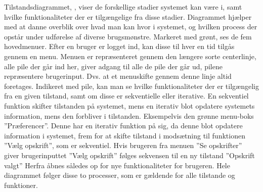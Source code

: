 Tilstandsdiagrammet, , viser de forskellige stadier systemet kan være i, samt hvilke funktionaliteter der er tilgængelige fra disse stadier.
Diagrammet hjælper med at danne overblik over hvad man kan hvor i systemet, og hvilken process der opstår under udførelse af diverse brugsmønstre.
Markeret med grønt, ses de fem hovedmenuer. 
Efter en bruger er logget ind, kan disse til hver en tid tilgås gennem en menu.
Menuen er repræsenteret gennem den længere sorte centerlinje,  alle pile der går ind her, giver adgang til alle de pile der går ud, pilene repræsentere brugerinput.
Dvs. at et menuskifte gennem denne linje altid foretages.
Indikeret med pile, kan man se hvilke funktionaliteter der er tilgængelig fra en given tilstand, samt om disse er sekventielle eller iterative.
En sekventiel funktion skifter tilstanden på systemet, mens en iterativ blot opdatere systemets information, mens den forbliver i tilstanden.
Eksempelvis den grønne menu-boks ''Præferencer''.
Denne har en iterativ funktion på sig, da denne blot opdatere information i systemet, frem for at skifte tilstand i modsætning til funktionen ''Vælg opskrift'', som er sekventiel.
Hvis brugeren fra menuen ''Se opskrifter'' giver brugerinputtet ''Vælg opskrift'' følges sekvensen til en ny tilstand ''Opskrift valgt'' Herfra åbnes således op for nye funktionaliteter for brugeren.
Hele diagrammet følger disse to processer, som er gældende for alle tilstande og funktioner.

